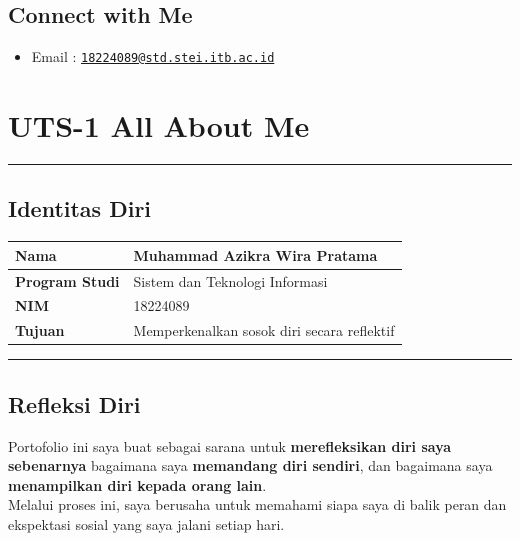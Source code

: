 \documentclass[
  letterpaper,
  DIV=11,
  numbers=noendperiod]{scrreprt}
\providecommand{\tightlist}{%
  \setlength{\itemsep}{0pt}\setlength{\parskip}{0pt}}
\begin{document}
\section*{Connect with Me}\label{connect-with-me}


\begin{itemize}
\tightlist
\item
  Email :
  \href{mailto:18224089@std.stei.itb.ac.id}{\nolinkurl{18224089@std.stei.itb.ac.id}}
\end{itemize}


\chapter{UTS-1 All About Me}\label{uts-1-all-about-me}

\begin{center}\rule{0.5\linewidth}{0.5pt}\end{center}

\section{Identitas Diri}\label{identitas-diri}

\begin{longtable}[]{@{}ll@{}}
\toprule\noalign{}
\textbf{Nama} & Muhammad Azikra Wira Pratama \\
\midrule\noalign{}
\endhead
\bottomrule\noalign{}
\endlastfoot
\textbf{Program Studi} & Sistem dan Teknologi Informasi \\
\textbf{NIM} & 18224089 \\
\textbf{Tujuan} & Memperkenalkan sosok diri secara reflektif \\
\end{longtable}

\begin{center}\rule{0.5\linewidth}{0.5pt}\end{center}

\section{Refleksi Diri}\label{refleksi-diri}

Portofolio ini saya buat sebagai sarana untuk \textbf{merefleksikan diri
saya sebenarnya} bagaimana saya \textbf{memandang diri sendiri}, dan
bagaimana saya \textbf{menampilkan diri kepada orang lain}.\\
Melalui proses ini, saya berusaha untuk memahami siapa saya di balik
peran dan ekspektasi sosial yang saya jalani setiap hari.
\end{document}
